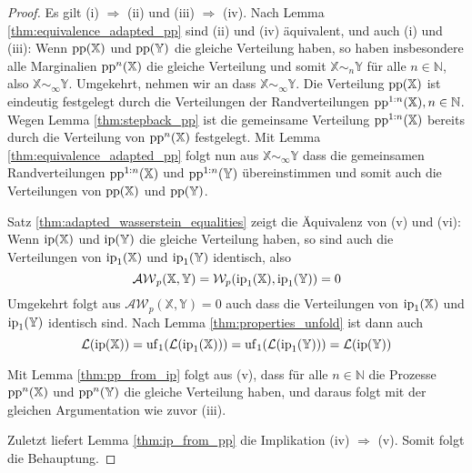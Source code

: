     \begin{proof}
        Es gilt (i) $\Rightarrow$ (ii) und (iii) $\Rightarrow$ (iv). Nach Lemma \ref{thm:equivalence_adapted_pp} sind (ii) und (iv) äquivalent, und auch (i) und (iii): Wenn $\operatorname{pp}(\mathbb{X})$ und $\operatorname{pp}(\mathbb{Y})$ die gleiche Verteilung haben, so haben insbesondere alle Marginalien $\operatorname{pp}^n(\mathbb{X})$ die gleiche Verteilung und somit $\mathbb{X}\sim_n \mathbb{Y}$ für alle $n\in\mathbb{N}$, also $\mathbb{X} \sim_{\infty} \mathbb{Y}$. Umgekehrt, nehmen wir an dass $\mathbb{X}\sim_{\infty}\mathbb{Y}$. Die Verteilung $\operatorname{pp}(\mathbb{X})$ ist eindeutig festgelegt durch die Verteilungen der Randverteilungen $\operatorname{pp}^{1:n}(\mathbb{X}), n\in\mathbb{N}$. Wegen Lemma \ref{thm:stepback_pp} ist die gemeinsame Verteilung $\operatorname{pp}^{1:n}(\mathbb{X})$ bereits durch die Verteilung von $\operatorname{pp}^n(\mathbb{X})$ festgelegt. Mit Lemma \ref{thm:equivalence_adapted_pp} folgt nun aus $\mathbb{X} \sim_\infty\mathbb{Y}$ dass die gemeinsamen Randverteilungen $\operatorname{pp}^{1:n}(\mathbb{X})$ und $\operatorname{pp}^{1:n}(\mathbb{Y})$ übereinstimmen und somit auch die Verteilungen von $\operatorname{pp}(\mathbb{X})$ und $\operatorname{pp}(\mathbb{Y})$.

        Satz \ref{thm:adapted_wasserstein_equalities} zeigt die Äquivalenz von (v) und (vi): Wenn $\operatorname{ip}(\mathbb{X})$ und $\operatorname{ip}(\mathbb{Y})$ die gleiche Verteilung haben, so sind auch die Verteilungen von $\operatorname{ip}_1(\mathbb{X})$ und $\operatorname{ip}_1(\mathbb{Y})$ identisch, also
        $$\mathcal{AW}_p(\mathbb{X,Y}) = \mathcal{W}_p(\operatorname{ip}_1(\mathbb{X}), \operatorname{ip}_1(\mathbb{Y})) = 0$$
        Umgekehrt folgt aus $\mathcal{AW}_p(\mathbb{X}, \mathbb{Y})=0$ auch dass die Verteilungen von $\operatorname{ip}_1(\mathbb{X})$ und $\operatorname{ip}_1(\mathbb{Y})$ identisch sind. Nach Lemma \ref{thm:properties_unfold} ist dann auch
        $$\mathcal{L}(\operatorname{ip}(\mathbb{X})) = \operatorname{uf}_1(\mathcal{L}(\operatorname{ip}_1(\mathbb{X}))) = \operatorname{uf}_1(\mathcal{L}(\operatorname{ip}_1(\mathbb{Y}))) = \mathcal{L}(\operatorname{ip}(\mathbb{Y}))$$

        Mit Lemma \ref{thm:pp_from_ip} folgt aus (v), dass für alle $n\in\mathbb{N}$ die Prozesse $\operatorname{pp}^n(\mathbb{X})$ und $\operatorname{pp}^n(\mathbb{Y})$ die gleiche Verteilung haben, und daraus folgt mit der gleichen Argumentation wie zuvor (iii).

        Zuletzt liefert Lemma \ref{thm:ip_from_pp} die Implikation (iv) $\Rightarrow$ (v). Somit folgt die Behauptung.
    \end{proof}
